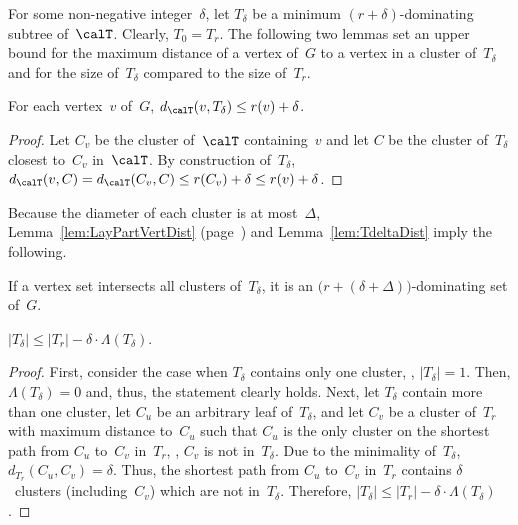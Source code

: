 For some non-negative integer~$\delta$, let $T_\delta$ be a minimum $(r + \delta)$-dominating subtree of~$\calT$.
Clearly, $T_0 = T_r$.
The following two lemmas set an upper bound for the maximum distance of a vertex of~$G$ to a vertex in a cluster of~$T_\delta$ and for the size of~$T_\delta$ compared to the size of~$T_r$.

\begin{lemma}
    \label{lem:TdeltaDist}
For each vertex~\( v \) of~\( G \), \( d_\calT(v, T_\delta) \leq r(v) + \delta \).
\end{lemma}

\begin{proof}
Let $C_v$ be the cluster of~$\calT$ containing~$v$ and let $C$ be the cluster of~$T_\delta$ closest to~$C_v$ in~$\calT$.
By construction of~$T_\delta$, $d_\calT(v, C) = d_\calT(C_v, C) \leq r(C_v) + \delta \leq r(v) + \delta$.
\end{proof}

Because the diameter of each cluster is at most~$\Delta$, Lemma~\ref{lem:LayPartVertDist} (page~\pageref{lem:LayPartVertDist}) and Lemma~\ref{lem:TdeltaDist} imply the following.

\begin{corollary}
    \label{cor:TdeltaDomSet}
If a vertex set intersects all clusters of~\( T_\delta \), it is an \( \big( r + (\delta + \Delta) \big) \)-dominating set of~\( G \).
\end{corollary}

\begin{lemma}
    \label{lem:TdeltaTrCardinality}
\( |T_{\delta}| \leq |T_r| - \delta \cdot \Lambda(T_\delta) \).
\end{lemma}

\begin{proof}
First, consider the case when $T_\delta$ contains only one cluster, \ie, $|T_\delta| = 1$.
Then, $\Lambda(T_\delta) = 0$ and, thus, the statement clearly holds.
Next, let $T_\delta$ contain more than one cluster, let $C_u$ be an arbitrary leaf of~$T_\delta$, and let $C_v$ be a cluster of~$T_r$ with maximum distance to~$C_u$ such that $C_u$ is the only cluster on the shortest path from $C_u$ to~$C_v$ in~$T_r$, \ie, $C_v$ is not in~$T_\delta$.
Due to the minimality of~$T_\delta$, $d_{T_r}(C_u, C_v) = \delta$.
Thus, the shortest path from $C_u$ to~$C_v$ in~$T_r$ contains $\delta$~clusters (including~$C_v$) which are not in~$T_\delta$.
Therefore, $|T_{\delta}| \leq |T_r| - \delta \cdot \Lambda(T_\delta)$.
\end{proof}


